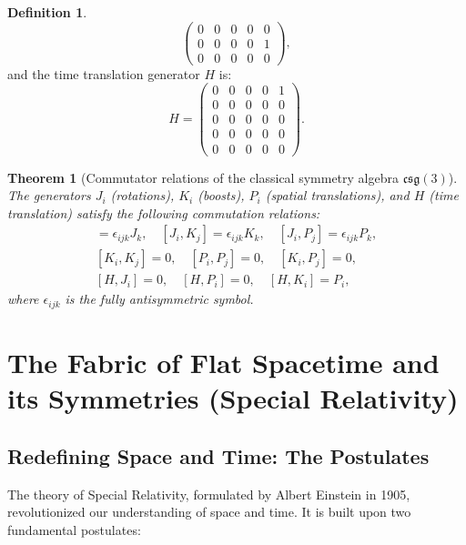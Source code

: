 \documentclass{amsart}
\newtheorem{theorem}{Theorem}[section]
\theoremstyle{definition}
\newtheorem{definition}{Definition}[theorem]
\theoremstyle{remark}
\begin{document}
\begin{definition}
\begin{equation*}
\begin{pmatrix}
    0 & 0 & 0 & 0 & 0 \\
    0 & 0 & 0 & 0 & 1 \\
    0 & 0 & 0 & 0 & 0
  \end{pmatrix},
  \end{equation*}
  and the time translation generator $H$ is:
  \begin{equation*}
  H =
  \begin{pmatrix}
    0 & 0 & 0 & 0 & 1 \\
    0 & 0 & 0 & 0 & 0 \\
    0 & 0 & 0 & 0 & 0 \\
    0 & 0 & 0 & 0 & 0 \\
    0 & 0 & 0 & 0 & 0
  \end{pmatrix}.
  \end{equation*}
\end{definition}

\begin{theorem}[Commutator relations of the classical symmetry algebra $\mathfrak{csg}(3)$]\label{thm:csg3_commutation_relations}
  The generators \(J_i\) (rotations), \(K_i\) (boosts), \(P_i\) (spatial translations), and \(H\) (time translation) satisfy the following commutation relations:
  \begin{gather*}
  [J_i, J_j] = \epsilon_{ijk} J_k, \quad
  [J_i, K_j] = \epsilon_{ijk} K_k, \quad
  [J_i, P_j] = \epsilon_{ijk} P_k, \\
  [K_i, K_j] = 0, \quad
  [P_i, P_j] = 0, \quad
  [K_i, P_j] = 0, \\
  [H, J_i] = 0, \quad
  [H, P_i] = 0, \quad
  [H, K_i] = P_i,
  \end{gather*}
  where $\epsilon_{ijk}$ is the fully antisymmetric symbol.
\end{theorem}

\section{The Fabric of Flat Spacetime and its Symmetries (Special Relativity)}
\label{sec:sr}

\subsection{Redefining Space and Time: The Postulates}
\label{subsec:sr_postulates}
The theory of Special Relativity, formulated by Albert Einstein in 1905, revolutionized our understanding of space and time. It is built upon two fundamental postulates:
\end{document}
